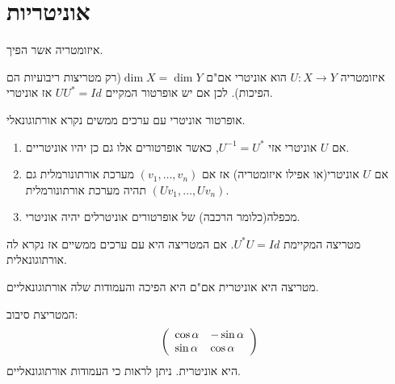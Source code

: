 \documentclass{tstextbook}
\begin{document}
\section{אוניטריות}

\begin{definition}
איזומטריה אשר הפיך.

\end{definition}
\begin{corollary}
איזומטריה \(U:X\to Y\) הוא אוניטרי אם"ם \(\dim X=\dim Y\)(רק מטריצות ריבועיות הם הפיכות). לכן אם יש אופרטור המקיים \(U U^{*}=Id\) אז אוניטרי.

\end{corollary}
\begin{definition}
אופרטור אוניטרי עם ערכים ממשים נקרא אורתוגונאלי.

\end{definition}
\begin{proposition}
  \begin{enumerate}
    \item אם \(U\) אוניטרי אזי \(U^{-1}=U^{*}\), כאשר אופרטורים אלו גם כן יהיו אוניטריים. 


    \item אם \(U\) אוניטרי(או אפילו איזומטריה) אז אם \(\left( v_{1},\dots,v_{n} \right)\) מערכת אורתונורמלית גם \(\left( Uv_{1},\dots,Uv_{n}  \right)\) תהיה מערכת אורתונורמלית. 


    \item מכפלה(כלומר הרכבה) של אופרטורים אוניטרלים יהיה אוניטרי. 


  \end{enumerate}
\end{proposition}
\begin{definition}
מטריצה המקיימת \(U^{*}U=Id\). אם המטריצה היא עם ערכים ממשיים אז נקרא לה אורתוגונאלית.

\end{definition}
\begin{corollary}
מטריצה היא אוניטרית אם"ם היא הפיכה והעמודות שלה אורתוגונאליים.

\end{corollary}
\begin{example}
המטריצת סיבוב:
$$\left(\begin{array}{l l}{{\cos\alpha}}&{{-\sin\alpha}}\\ {{\sin\alpha}}&{{\cos\alpha}}\end{array}\right)$$
היא אוניטרית. ניתן לראות כי העמודות אורתוגונאליים.

\end{example}
\end{document}
